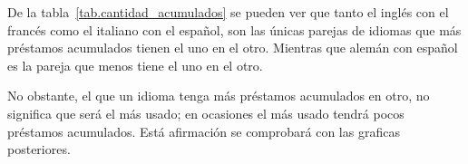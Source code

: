 
De la tabla~\ref{tab.cantidad_acumulados} se pueden ver que tanto el inglés con el francés como el italiano con el español, son las únicas parejas de idiomas que más préstamos acumulados tienen el uno en el otro. Mientras que alemán con español es la pareja que menos tiene el uno en el otro. 

No obstante, el que un idioma tenga más préstamos acumulados en otro, no significa que será el más usado;  en ocasiones el más usado tendrá pocos préstamos acumulados.  Está afirmación se comprobará con las graficas posteriores. 






